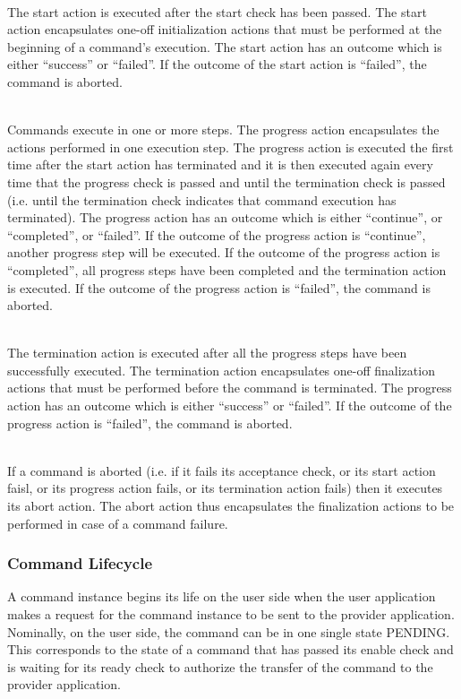 \begin{fw_description}
\item[Start Action]\hfill\\
The start action is executed after the start check has been passed. The start action encapsulates one-off initialization actions that must be performed at the beginning of a command's execution. 
The start action has an outcome which is either “success” or “failed”. If the outcome of the start action is “failed”, the command is aborted.
\item[Progress Action]\hfill\\
Commands execute in one or more steps. The progress action encapsulates the actions performed in one execution step. The progress action is executed the first time after the start action has terminated and it is then executed again every time that the progress check is passed and until the termination check is passed (i.e. until the termination check indicates that command execution has terminated). 
The progress action has an outcome which is either “continue”, or “completed”, or “failed”. If the outcome of the progress action is “continue”, another progress step will be executed. If the outcome of the progress action is “completed”, all progress steps have been completed and the termination action is executed. If the outcome of the progress action is “failed”, the command is aborted. 
\item[Termination Action]\hfill\\
The termination action is executed after all the progress steps have been successfully executed. The termination action encapsulates one-off finalization actions that must be performed before the command is terminated.
The progress action has an outcome which is either “success” or “failed”. If the outcome of the progress action is “failed”, the command is aborted. 
\item[Abort Action]\hfill\\
If a command is aborted (i.e. if it fails its acceptance check, or its start action faisl, or its progress action fails, or its termination action fails) then it executes its abort action. The abort action thus encapsulates the finalization actions to be performed in case of a command failure. 
\end{fw_description}

\subsubsection{Command Lifecycle}\label{sec:CmdLifecycle}
A command instance begins its life on the user side when the user application makes a request for the command instance to be sent to the provider application. Nominally, on the user side, the command can be in one single state PENDING. This corresponds to the state of a command that has passed its enable check and is waiting for its ready check to authorize the transfer of the command to the provider application. 

